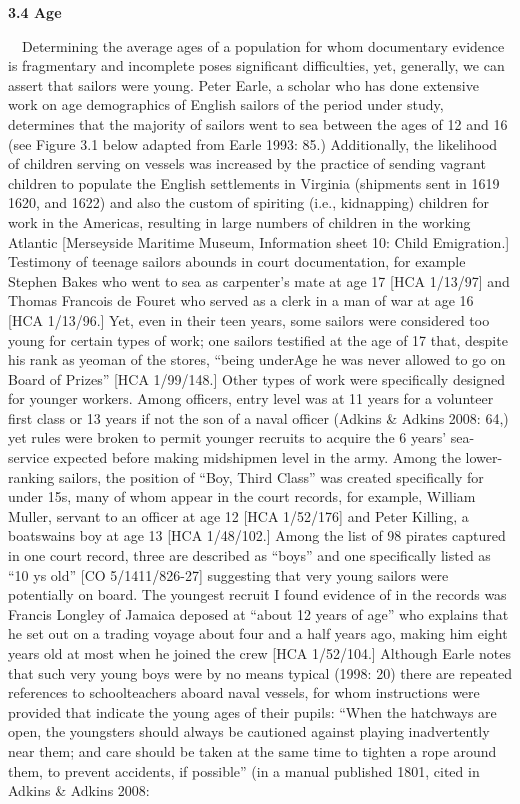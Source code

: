 \begin{styleStandard}
\textbf{3.4 Age}
\end{styleStandard}


\begin{styleStandard}
\ \ Determining the average ages of a population for whom documentary evidence is fragmentary and incomplete poses significant difficulties, yet, generally, we can assert that sailors were young. Peter Earle, a scholar who has done extensive work on age demographics of English sailors of the period under study, determines that the majority of sailors went to sea between the ages of 12 and 16 (see Figure 3.1 below adapted from Earle 1993: 85.) Additionally, the likelihood of children serving on vessels was increased by the practice of sending vagrant children to populate the English settlements in Virginia (shipments sent in 1619 1620, and 1622) and also the custom of spiriting (i.e., kidnapping) children for work in the Americas, resulting in large numbers of children in the working Atlantic [Merseyside Maritime Museum, Information sheet 10: Child Emigration.] Testimony of teenage sailors abounds in court documentation, for example Stephen Bakes who went to sea as carpenter’s mate at age 17 [HCA 1/13/97] and Thomas Francois de Fouret who served as a clerk in a man of war at age 16 [HCA 1/13/96.] Yet, even in their teen years, some sailors were considered too young for certain types of work; one sailors testified at the age of 17 that, despite his rank as yeoman of the stores, “being underAge he was never allowed to go on Board of Prizes” [HCA 1/99/148.] Other types of work were specifically designed for younger workers. Among officers, entry level was at 11 years for a volunteer first class or 13 years if not the son of a naval officer (Adkins \& Adkins 2008: 64,) yet rules were broken to permit younger recruits to acquire the 6 years’ sea-service expected before making midshipmen level in the army. Among the lower-ranking sailors, the position of “Boy, Third Class” was created specifically for under 15s, many of whom appear in the court records, for example, William Muller, servant to an officer at age 12 [HCA 1/52/176] and Peter Killing, a boatswain{\textquotesingle}s boy at age 13 [HCA 1/48/102.] Among the list of 98 pirates captured in one court record, three are described as “boys” and one specifically listed as “10 ys old” [CO 5/1411/826-27] suggesting that very young sailors were potentially on board. The youngest recruit I found evidence of in the records was Francis Longley of Jamaica deposed at “about 12 years of age” who explains that he set out on a trading voyage about four and a half years ago, making him eight years old at most when he joined the crew [HCA 1/52/104.] Although Earle notes that such very young boys were by no means typical (1998: 20) there are repeated references to schoolteachers aboard naval vessels, for whom instructions were provided that indicate the young ages of their pupils: “When the hatchways are open, the youngsters should always be cautioned against playing inadvertently near them; and care should be taken at the same time to tighten a rope around them, to prevent accidents, if possible” (in a manual published 1801, cited in Adkins \& Adkins 2008: 
\end{styleStandard}
